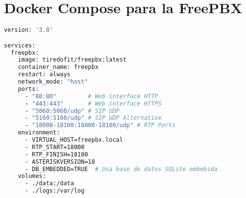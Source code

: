\section{Docker Compose para la FreePBX}
\label{Apendice2:docker_compose_freepbx}
\begin{lstlisting}[language=Dockerfile]
version: '3.8'

services:
  freepbx:
    image: tiredofit/freepbx:latest
    container_name: freepbx
    restart: always
    network_mode: "host"
    ports:
      - "80:80"         # Web interface HTTP
      - "443:443"       # Web interface HTTPS
      - "5060:5060/udp" # SIP UDP
      - "5160:5160/udp" # SIP UDP Alternative
      - "18000-18100:18000-18100/udp" # RTP Ports
    environment:
      - VIRTUAL_HOST=freepbx.local
      - RTP_START=18000
      - RTP_FINISH=18100
      - ASTERISKVERSION=18
      - DB_EMBEDDED=TRUE  # Usa base de datos SQLite embebida
    volumes:
      - ./data:/data
      - ./logs:/var/log
\end{lstlisting}